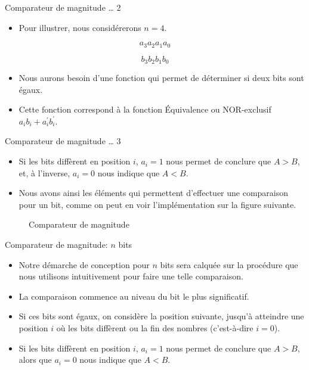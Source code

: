 \documentclass[presentation]{beamer}
\begin{document}
\begin{frame}[label={sec:orgbc8a508}]{Comparateur de magnitude \ldots{} 2}
\begin{itemize}
\item Pour illustrer, nous considérerons \(n = 4\).
\end{itemize}

$$ a_3 a_2 a_1 a_0 $$

$$ b_3 b_2 b_1 b_0 $$

\begin{itemize}
\item Nous aurons besoin d'une fonction qui permet de déterminer si deux bits sont égaux.

\item Cette fonction correspond à la fonction \alert{Équivalence} ou NOR-exclusif \(a_i b_i + a_i^\prime b_i^\prime\).
\end{itemize}
\end{frame}


\begin{frame}[label={sec:org86d268c}]{Comparateur de magnitude \ldots{} 3}
\begin{itemize}
\item Si les bits diffèrent en position \(i\), \(a_i = 1\) nous permet de conclure que \(A > B\), et, à l'inverse, \(a_i = 0\) nous indique que \(A < B\).

\item Nous avons ainsi les éléments qui permettent d'effectuer une comparaison pour un bit, comme on peut en voir l'implémentation sur la figure suivante.
\end{itemize}

\begin{figure}[htbp]
\centering

\caption{\label{fig:org3033d5f}Comparateur de magnitude}
\end{figure}
\end{frame}

\begin{frame}[label={sec:org4b32708}]{Comparateur de magnitude: \(n\) bits}
\begin{itemize}
\item Notre démarche de conception pour \(n\) bits sera calquée sur la procédure que nous utilisons intuitivement pour faire une telle comparaison.

\item La comparaison commence au niveau du bit le plus significatif.

\item Si ces bits sont égaux, on considère la position suivante, jusqu'à atteindre une position \(i\) où les bits diffèrent ou la fin des nombres (c'est-à-dire \(i=0\)).

\item Si les bits diffèrent en position \(i\), \(a_i = 1\) nous permet de conclure que \(A > B\), alors que \(a_i = 0\) nous indique que \(A < B\).
\end{itemize}
\end{frame}
\end{document}
